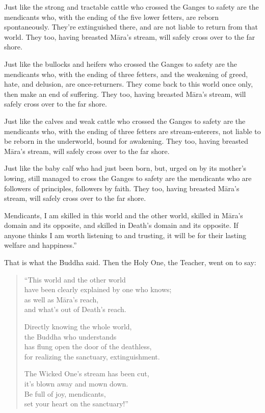 \documentclass[12pt,openany]{book}%
\begin{document}
Just like the strong and tractable cattle who crossed the Ganges to safety are the mendicants who, with the ending of the five lower fetters, are reborn spontaneously. They’re extinguished there, and are not liable to return from that world. They too, having breasted \textsanskrit{Māra}’s stream, will safely cross over to the far shore. 

Just like the bullocks and heifers who crossed the Ganges to safety are the mendicants who, with the ending of three fetters, and the weakening of greed, hate, and delusion, are once-returners. They come back to this world once only, then make an end of suffering. They too, having breasted \textsanskrit{Māra}’s stream, will safely cross over to the far shore. 

Just like the calves and weak cattle who crossed the Ganges to safety are the mendicants who, with the ending of three fetters are stream-enterers, not liable to be reborn in the underworld, bound for awakening. They too, having breasted \textsanskrit{Māra}’s stream, will safely cross over to the far shore. 

Just like the baby calf who had just been born, but, urged on by its mother’s lowing, still managed to cross the Ganges to safety are the mendicants who are followers of principles, followers by faith. They too, having breasted \textsanskrit{Māra}’s stream, will safely cross over to the far shore. 

Mendicants, I am skilled in this world and the other world, skilled in \textsanskrit{Māra}’s domain and its opposite, and skilled in Death’s domain and its opposite. If anyone thinks I am worth listening to and trusting, it will be for their lasting welfare and happiness.” 

That is what the Buddha said. Then the Holy One, the Teacher, went on to say: 

\begin{verse}%
“This world and the other world \\
have been clearly explained by one who knows; \\
as well as \textsanskrit{Māra}’s reach, \\
and what’s out of Death’s reach. 

Directly knowing the whole world, \\
the Buddha who understands \\
has flung open the door of the deathless, \\
for realizing the sanctuary, extinguishment. 

The Wicked One’s stream has been cut, \\
it’s blown away and mown down. \\
Be full of joy, mendicants, \\
set your heart on the sanctuary!” 

%
\end{verse}
\end{document}
